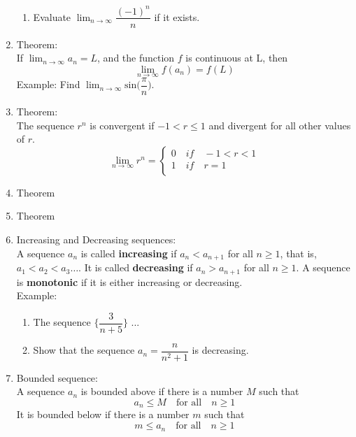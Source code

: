 \documentclass[12pt]{amsart}
\begin{document}
\begin{enumerate}
\begin{enumerate}
			\item Evaluate $\lim_{n \to \infty}\dfrac{(-1)^n}{n}$ if it exists.
			
			
			
			
		\end{enumerate}
	\item Theorem: \\
			If $\lim_{n \to \infty}a_n = L$, and the function $f$ is continuous at L, then 
			\[
			\lim_{n \to \infty} f(a_n) = f(L)
			\]
		Example: Find $\lim_{n \to \infty} \text{sin}\Bigg(\dfrac{\pi}{n}\Bigg)$.\\
		
	\item Theorem: \\
		The sequence $r^n$ is convergent if $-1 < r \leq 1$ and divergent for all other values of $r$.
		\[
		\lim_{n \to \infty} r^n = \begin{cases} 0 \quad if \quad -1 < r < 1 \\
									1 \quad if \quad r = 1 \\
						\end{cases}
		\]
	
	\item Theorem 
	
	\item Theorem 
	
	\item Increasing and Decreasing sequences: \\
		A sequence $a_n$ is called \textbf{increasing} if $a_n < a_{n+1}$ for all $n \geq 1$, that is, $a_1 < a_2 < a_3 \dots.$ It is called \textbf{decreasing} if $a_n > a_{n+1}$ for all $n \geq 1$. A sequence is \textbf{monotonic} if it is either increasing or decreasing. \\
		
		Example: \\
			\begin{enumerate}
				\item The sequence $\Bigg\{ \dfrac{3}{n+5}\Bigg\}$ ... 
				
				\item Show that the sequence $a_n = \dfrac{n}{n^2 + 1}$ is decreasing.
				
			\end{enumerate} 
	
	\item Bounded sequence:\\
		A sequence $a_n$ is bounded above if there is a number $M$ such that 
		\[
		a_n \leq M \quad \text{for all}  \quad n \geq 1
		\]
	It is bounded below if there is a number $m$ such that 
	\[
	m \leq a_n  \quad \text{for all}  \quad n \geq 1
	\]
	

\end{enumerate}
\end{document}
